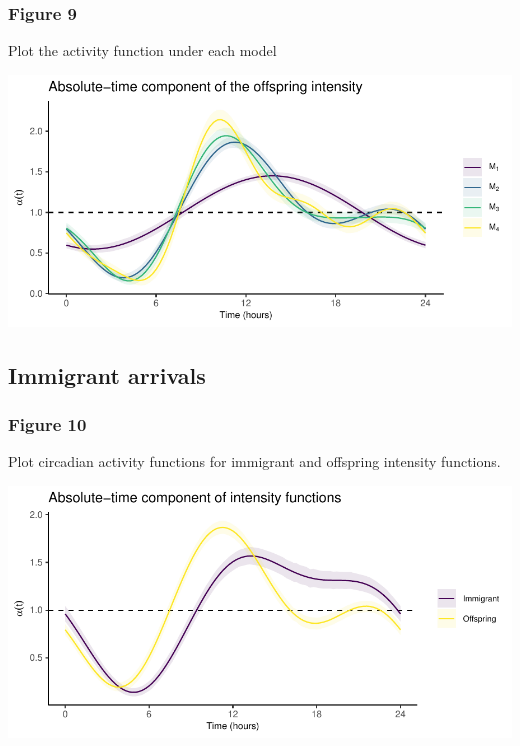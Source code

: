 \documentclass[
]{article}
\begin{document}
\hypertarget{figure-9}{%
\subsubsection{Figure 9}\label{figure-9}}

Plot the activity function under each model

\includegraphics{figures_and_tables_files/figure-latex/freq_activity_functions-1.pdf}

\hypertarget{immigrant-arrivals}{%
\subsection{Immigrant arrivals}\label{immigrant-arrivals}}

\hypertarget{figure-10}{%
\subsubsection{Figure 10}\label{figure-10}}

Plot circadian activity functions for immigrant and offspring intensity
functions.

\includegraphics{figures_and_tables_files/figure-latex/immigrant_activity_function-1.pdf}
\end{document}
